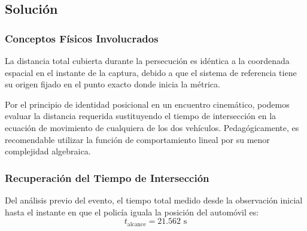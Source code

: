 \documentclass[12pt, a4paper]{article}
\begin{document}
\begin{center}
\end{center}

\subsection*{Solución}

\subsubsection*{Conceptos Físicos Involucrados}

La distancia total cubierta durante la persecución es idéntica a la coordenada espacial en el instante de la captura, debido a que el sistema de referencia tiene su origen fijado en el punto exacto donde inicia la métrica. 

Por el principio de identidad posicional en un encuentro cinemático, podemos evaluar la distancia requerida sustituyendo el tiempo de intersección en la ecuación de movimiento de cualquiera de los dos vehículos. Pedagógicamente, es recomendable utilizar la función de comportamiento lineal por su menor complejidad algebraica.

\subsubsection*{Recuperación del Tiempo de Intersección}

Del análisis previo del evento, el tiempo total medido desde la observación inicial hasta el instante en que el policía iguala la posición del automóvil es:
\begin{equation}
t_{\text{alcance}} = 21.562 \text{ s}
\end{equation}
\end{document}
